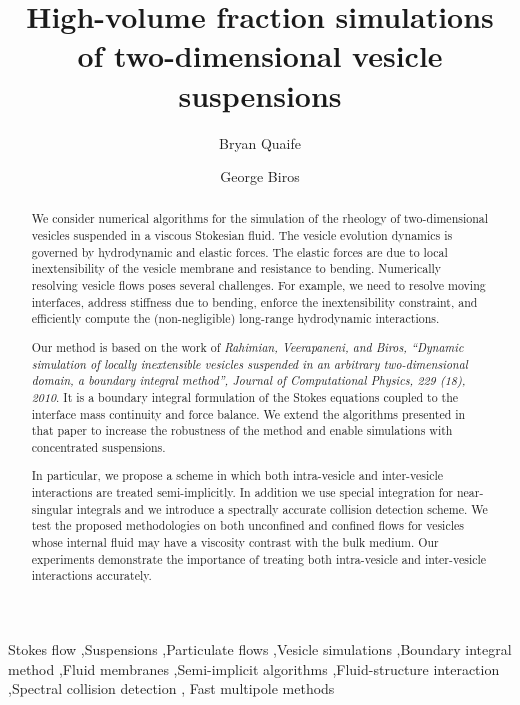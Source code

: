 \documentclass[preprint, 10pt]{elsarticle}
\begin{document}
\title{High-volume fraction simulations of two-dimensional vesicle
  suspensions}

\author[ut]{Bryan Quaife} 
\author[ut]{George Biros}
\address[ut]{Institute of Computational Engineering and Sciences,\\
  The University of Texas at Austin, Austin, TX, 78712.}

\begin{abstract} 
We consider numerical algorithms for the simulation of the rheology of
two-dimensional vesicles suspended in a viscous Stokesian fluid.  The
vesicle evolution dynamics is governed by hydrodynamic and elastic
forces. The elastic forces are due to local inextensibility of the
vesicle membrane and resistance to bending.  Numerically resolving
vesicle flows poses several challenges.  For example, we need to
resolve moving interfaces, address stiffness due to bending, enforce
the inextensibility constraint, and efficiently compute the
(non-negligible) long-range hydrodynamic interactions.

Our method is based on the work of {\em Rahimian, Veerapaneni, and
Biros, ``Dynamic simulation of locally inextensible vesicles suspended
in an arbitrary two-dimensional domain, a boundary integral method'',
Journal of Computational Physics, 229 (18), 2010}.  It is a boundary
integral formulation of the Stokes equations coupled to the interface
mass continuity and force balance.  We extend the algorithms presented
in that paper to increase the robustness of the method and enable
simulations with concentrated suspensions.

In particular, we propose a scheme in which both intra-vesicle and
inter-vesicle interactions are treated semi-implicitly.  In addition we
use special integration for near-singular integrals and we introduce a
spectrally accurate collision detection scheme.  We test the proposed
methodologies on both unconfined and confined flows for vesicles whose
internal fluid may have a viscosity contrast with the bulk medium.  Our
experiments demonstrate the importance of treating both intra-vesicle
and inter-vesicle interactions accurately.
\end{abstract}

\begin{keyword}
  Stokes flow \sep Suspensions \sep Particulate flows \sep Vesicle
  simulations \sep Boundary integral method \sep Fluid
  membranes \sep   Semi-implicit algorithms \sep Fluid-structure
  interaction \sep Spectral collision detection \sep 
  Fast multipole methods 
\end{keyword}
\end{document}
